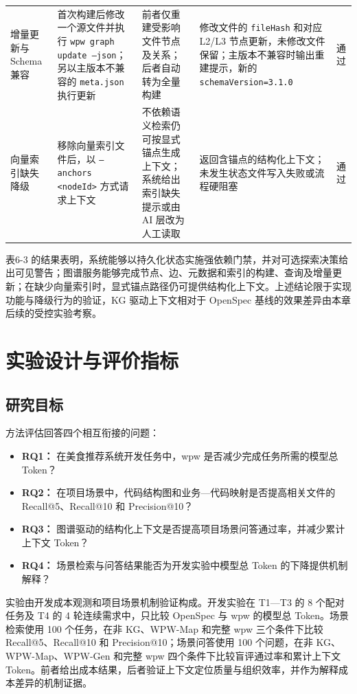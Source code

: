 \begin{table}[htbp]
\begin{tabularx}{\textwidth}{|X|X|X|X|X|}
增量更新与 Schema 兼容 & 首次构建后修改一个源文件并执行 \texttt{wpw graph update --json}；另以主版本不兼容的 \texttt{meta.json} 执行更新 & 前者仅重建受影响文件节点及关系；后者自动转为全量构建 & 修改文件的 \texttt{fileHash} 和对应 L2/L3 节点更新，未修改文件保留；主版本不兼容时输出重建提示，新的 \texttt{schemaVersion=3.1.0} & 通过 \\
向量索引缺失降级 & 移除向量索引文件后，以 \texttt{--anchors <nodeId>} 方式请求上下文 & 不依赖语义检索仍可按显式锚点生成上下文；系统给出索引缺失提示或由 AI 层改为人工读取 & 返回含锚点的结构化上下文；未发生状态文件写入失败或流程硬阻塞 & 通过 \\
\hline
\end{tabularx}
\end{table}

表6-3 的结果表明，系统能够以持久化状态实施强依赖门禁，并对可选探索决策给出可见警告；图谱服务能够完成节点、边、元数据和索引的构建、查询及增量更新；在缺少向量索引时，显式锚点路径仍可提供结构化上下文。上述结论限于实现功能与降级行为的验证，KG 驱动上下文相对于 OpenSpec 基线的效果差异由本章后续的受控实验考察。


\section{实验设计与评价指标}

\subsection{研究目标}
方法评估回答四个相互衔接的问题：

\begin{itemize}
\item \textbf{RQ1：} 在美食推荐系统开发任务中，wpw 是否减少完成任务所需的模型总 Token？
\item \textbf{RQ2：} 在项目场景中，代码结构图和业务—代码映射是否提高相关文件的 Recall@5、Recall@10 和 Precision@10？
\item \textbf{RQ3：} 图谱驱动的结构化上下文是否提高项目场景问答通过率，并减少累计上下文 Token？
\item \textbf{RQ4：} 场景检索与问答结果能否为开发实验中模型总 Token 的下降提供机制解释？
\end{itemize}
实验由开发成本观测和项目场景机制验证构成。开发实验在 T1—T3 的 8 个配对任务及 T4 的 4 轮连续需求中，只比较 OpenSpec 与 wpw 的模型总 Token。场景检索使用 100 个任务，在非 KG、WPW-Map 和完整 wpw 三个条件下比较 Recall@5、Recall@10 和 Precision@10；场景问答使用 100 个问题，在非 KG、WPW-Map、WPW-Gen 和完整 wpw 四个条件下比较盲评通过率和累计上下文 Token。前者给出成本结果，后者验证上下文定位质量与组织效率，并作为解释成本差异的机制证据。


